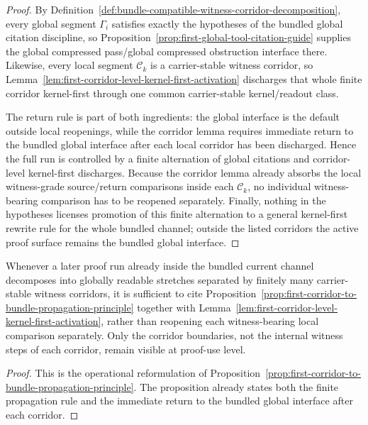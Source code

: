 \begin{proof}
By Definition~\ref{def:bundle-compatible-witness-corridor-decomposition}, every global segment $\Gamma_i$ satisfies exactly the hypotheses of the bundled global citation discipline, so Proposition~\ref{prop:first-global-tool-citation-guide} supplies the global compressed pass/global compressed obstruction interface there. Likewise, every local segment $\mathcal C_k$ is a carrier-stable witness corridor, so Lemma~\ref{lem:first-corridor-level-kernel-first-activation} discharges that whole finite corridor kernel-first through one common carrier-stable kernel/readout class.

The return rule is part of both ingredients: the global interface is the default outside local reopenings, while the corridor lemma requires immediate return to the bundled global interface after each local corridor has been discharged. Hence the full run is controlled by a finite alternation of global citations and corridor-level kernel-first discharges. Because the corridor lemma already absorbs the local witness-grade source/return comparisons inside each $\mathcal C_k$, no individual witness-bearing comparison has to be reopened separately. Finally, nothing in the hypotheses licenses promotion of this finite alternation to a general kernel-first rewrite rule for the whole bundled channel; outside the listed corridors the active proof surface remains the bundled global interface.
\end{proof}

\begin{corollary}
\label{cor:use-rule-for-the-first-corridor-to-bundle-propagation-principle}
Whenever a later proof run already inside the bundled current channel decomposes into globally readable stretches separated by finitely many carrier-stable witness corridors, it is sufficient to cite Proposition~\ref{prop:first-corridor-to-bundle-propagation-principle} together with Lemma~\ref{lem:first-corridor-level-kernel-first-activation}, rather than reopening each witness-bearing local comparison separately. Only the corridor boundaries, not the internal witness steps of each corridor, remain visible at proof-use level.
\end{corollary}

\begin{proof}
This is the operational reformulation of Proposition~\ref{prop:first-corridor-to-bundle-propagation-principle}. The proposition already states both the finite propagation rule and the immediate return to the bundled global interface after each corridor.
\end{proof}


